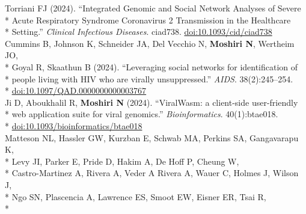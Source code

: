 \documentclass[margin,line]{res}
\begin{document}
\begin{resume}
\hspace*{9mm} Torriani FJ (2024). ``Integrated Genomic and Social Network Analyses of Severe\\*
\hspace*{9mm} Acute Respiratory Syndrome Coronavirus 2 Transmission in the Healthcare\\*\vspace{2mm}
\hspace*{8mm} Setting.'' \textit{Clinical Infectious Diseases}. ciad738. \href{https://doi.org/10.1093/cid/ciad738}{doi:10.1093/cid/ciad738}\\
\hspace*{4mm} Cummins B, Johnson K, Schneider JA, Del Vecchio N, \textbf{Moshiri N}, Wertheim JO,\\*
\hspace*{9mm} Goyal R, Skaathun B (2024). ``Leveraging social networks for identification of\\*
\hspace*{9mm} people living with HIV who are virally unsuppressed.'' \textit{AIDS}. 38(2):245--254.\\*\vspace{2mm}
\hspace*{8mm} \href{https://doi.org/10.1097/QAD.0000000000003767}{doi:10.1097/QAD.0000000000003767}\\
\hspace*{4mm} Ji D, Aboukhalil R, \textbf{Moshiri N} (2024). ``ViralWasm: a client-side user-friendly\\*
\hspace*{9mm} web application suite for viral genomics.'' \textit{Bioinformatics}. 40(1):btae018.\\*\vspace{2mm}
\hspace*{8mm} \href{https://doi.org/10.1093/bioinformatics/btae018}{doi:10.1093/bioinformatics/btae018}\\
\hspace*{4mm} Matteson NL, Hassler GW, Kurzban E, Schwab MA, Perkins SA, Gangavarapu K,\\*
\hspace*{9mm} Levy JI, Parker E, Pride D, Hakim A, De Hoff P, Cheung W,\\*
\hspace*{9mm} Castro-Martinez A, Rivera A, Veder A Rivera A, Wauer C, Holmes J, Wilson J,\\*
\hspace*{9mm} Ngo SN, Plascencia A, Lawrence ES, Smoot EW, Eisner ER, Tsai R,\\*

\end{resume}
\end{document}
